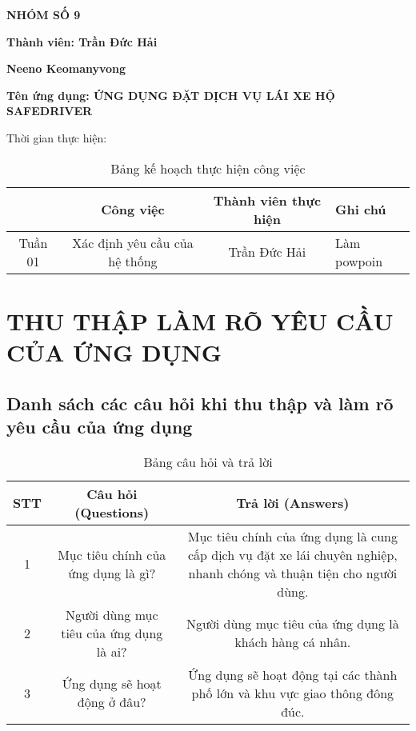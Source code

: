 \documentclass[a4paper,13pt]{report}
\numberwithin{figure}{chapter}
\numberwithin{figure}{section}
\begin{document}
\par \textbf{NHÓM SỐ 9} 
\par \textbf{Thành viên: Trần Đức Hải}
\par \textbf{Neeno Keomanyvong}
\par \textbf{Tên ứng dụng: ỨNG DỤNG ĐẶT DỊCH VỤ LÁI XE HỘ SAFEDRIVER } 
\par Thời gian thực hiện: 
\begin{table}[H]
    \centering
    \renewcommand{\arraystretch}{2.5}
    \begin{tabular}{|c|c|c|p{5.5cm}|}
        \hline
        \textbf{} & \textbf{Công việc} & \textbf{Thành viên thực hiện }& \textbf{Ghi chú}\\
        \hline
        \multirow{2}{*}{Tuần 01} & Xác định yêu cầu của hệ thống & Trần Đức Hải & 
        \par Làm powpoin  \\
        \hline
    \end{tabular}
    \caption{Bảng kế hoạch thực hiện công việc}
\end{table}

\tableofcontents
\listoffigures

\chapter*{THU THẬP LÀM RÕ YÊU CẦU CỦA ỨNG DỤNG}
\section{Danh sách các câu hỏi khi thu thập và làm rõ yêu cầu của ứng dụng}
\begin{table}[htbp]
  \centering
  \begin{tabular}{ccc}
    \toprule
    STT & Câu hỏi (Questions) & Trả lời (Answers) \\
    \midrule
    1 & Mục tiêu chính của ứng dụng là gì? & Mục tiêu chính của ứng dụng là cung cấp dịch vụ đặt xe lái chuyên nghiệp, nhanh chóng và thuận tiện cho người dùng. \\
    2 & Người dùng mục tiêu của ứng dụng là ai? & Người dùng mục tiêu của ứng dụng là khách hàng cá nhân. \\
    3 & Ứng dụng sẽ hoạt động ở đâu? & Ứng dụng sẽ hoạt động tại các thành phố lớn và khu vực giao thông đông đúc. \\
    \bottomrule
  \end{tabular}
  \caption{Bảng câu hỏi và trả lời}
\end{table}
\end{document}
